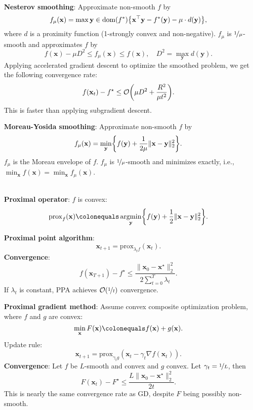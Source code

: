 \documentclass{article}
\DeclareMathOperator*{\argmin}{argmin}
\newcommand{\lft}{\mathopen{}\mathclose\bgroup\left}
\newcommand{\rgt}{\aftergroup\egroup\right}
\renewcommand{\vec}[1]{\mathbf{#1}}
\newcommand{\dom}[1]{\mathrm{dom}(#1)}
\newenvironment{topic}[1]
{\textbf{\sffamily \colorbox{black}{\rlap{\textbf{\textcolor{white}{#1}}}\hspace{\linewidth}\hspace{-2\fboxsep}}} \\ \vspace{0.2cm}}
{}
\begin{document}
\begin{multicols*}{2}
\begin{topic}{Smoothing}
        \textbf{Nesterov smoothing}: Approximate non-smooth $f$ by \[
            f_{\mu}(\vec{x}) = \max{\vec{y} \in \dom{f^*}} \lft\{ \vec{x}^\top \vec{y} - f^*(\vec{y}) - \mu \cdot d(\vec{y}) \rgt\},
        \]
        where $d$ is a proximity function (1-strongly convex and non-negative). $f_{\mu}$ is
        $\nicefrac{1}{\mu}$-smooth and approximates $f$ by \[
            f(\vec{x}) - \mu D^2 \leq f_{\mu}(\vec{x}) \leq f(\vec{x}), \quad D^2 = \max_{\vec{y}} d(\vec{y}).
        \]
        Applying accelerated gradient descent to optimize the smoothed problem, we get the following
        convergence rate: \[
            f(\vec{x}_t) - f^\star \leq \mathcal{O}\lft( \mu D^2 + \frac{R^2}{\mu t^2} \rgt).
        \]
        This is faster than applying subgradient descent.

        \textbf{Moreau-Yosida smoothing}: Approximate non-smooth $f$ by \[
            f_{\mu}(\vec{x}) = \min_{\vec{y}} \lft\{ f(\vec{y}) + \frac{1}{2 \mu} \| \vec{x} - \vec{y} \|_2^2 \rgt\}.
        \]
        $f_{\mu}$ is the Moreau envelope of $f$. $f_{\mu}$ is $\nicefrac{1}{\mu}$-smooth and
        minimizes exactly, i.e., $\min_{\vec{x}} f(\vec{x}) = \min_{\vec{x}} f_{\mu}(\vec{x})$.
    \end{topic}

    \begin{topic}{Proximal algorithms}
        \textbf{Proximal operator}: $f$ is convex: \[
            \mathrm{prox}_f(\vec{x}) \colonequals \argmin_{\vec{y}} \lft\{ f(\vec{y}) + \frac{1}{2} \| \vec{x} - \vec{y} \|_2^2 \rgt\}.
        \]

        \textbf{Proximal point algorithm}: \[
            \vec{x}_{t+1} = \mathrm{prox}_{\lambda_t f}(\vec{x}_t).
        \]
        \textbf{Convergence}: \[
            f(\vec{x}_{T+1}) - f^\star \leq \frac{\| \vec{x}_0 - \vec{x}^\star \|_2^2}{2 \sum_{t=0}^{T} \lambda_t}.
        \]
        If $\lambda_t$ is constant, PPA achieves $\mathcal{O}(\nicefrac{1}{t})$ convergence.

        \textbf{Proximal gradient method}: Assume convex composite optimization problem, where $f$ and $g$ are convex: \[
            \min_{\vec{x}} F(\vec{x}) \colonequals f(\vec{x}) + g(\vec{x}).
        \]
        Update rule: \[
            \vec{x}_{t+1} = \mathrm{prox}_{\gamma_t g} (\vec{x}_t - \gamma_t \nabla f(\vec{x}_t)).
        \]
        \textbf{Convergence}: Let $f$ be $L$-smooth and convex and $g$ convex. Let $\gamma_t = \nicefrac{1}{L}$, then \[
            F(\vec{x}_t) - F^\star \leq \frac{L \| \vec{x}_0 - \vec{x}^\star \|_2^2}{2t}.
        \]
        This is nearly the same convergence rate as GD, despite $F$ being possibly non-smooth.
    \end{topic}

\end{multicols*}
\end{document}
